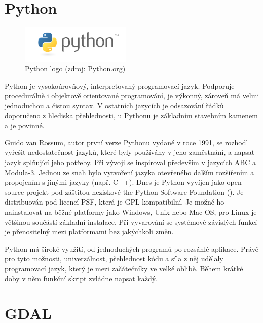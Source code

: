 
\section{Python}

\begin{figure}[H]
    \centering
      \includegraphics[width=150pt]{./pictures/python-logo-master-v3-TM.png}
      \caption[Python logo]{Python logo 
      (zdroj: \href{https://www.python.org/static/community_logos/python-logo-master-v3-TM.png}{Python.org})}
      \label{fig:python}
  \end{figure}
  
Python je vysokoúrovňový, interpretovaný programovací jazyk. Podporuje procedurálně i objektově orientované programování, je výkonný, zároveň má velmi jednoduchou a čistou syntax. V ostatních jazycích je odsazování řádků doporučeno z hlediska přehlednosti, u Pythonu je základním stavebním kamenem a je povinné. 

Guido van Rossum, autor první verze Pythonu vydané v roce 1991, se rozhodl vyřešit nedostatečnost jazyků, které byly používány v jeho zaměstnání, a napsat jazyk splňující jeho potřeby. Při vývoji se inspiroval především v jazycích ABC a Modula-3. Jednou ze snah bylo vytvoření jazyka otevřeného dalším rozšířením a propojením s jinými jazyky (např. C++). Dnes je Python vyvíjen jako open source projekt pod záštitou neziskové the Python Software Foundation (). Je distribuován pod licencí PSF, která je GPL kompatibilní. Je možné ho nainstalovat na běžné platformy jako Windows, Unix nebo Mac OS, pro Linux je většinou součástí základní instalace. Při vyvarování se systémově závislých funkcí je přenositelný mezi platformami bez jakýchkoli změn.

Python má široké využití, od jednoduchých programů po rozsáhlé aplikace. Právě pro tyto možnosti, univerzálnost, přehlednost kódu a síla z něj udělaly programovací jazyk, který je mezi začátečníky ve velké oblibě. Během krátké doby v něm funkční skript zvládne napsat každý. 
  
  
\section{GDAL}  


